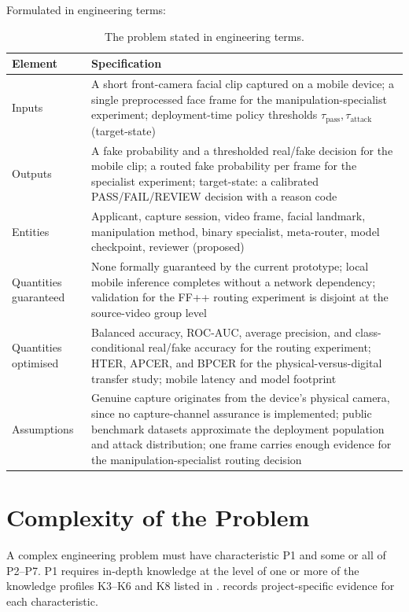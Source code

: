 Formulated in engineering terms:

\begin{table}[H]
\centering
\caption{The problem stated in engineering terms.}
\label{tab:engineering-terms}
\begin{tabularx}{\textwidth}{@{}p{32mm}Y@{}}
\toprule
Element & Specification \\
\midrule
Inputs & A short front-camera facial clip captured on a mobile device; a single
preprocessed face frame for the manipulation-specialist experiment; deployment-time
policy thresholds $\tau_{\mathrm{pass}},\tau_{\mathrm{attack}}$ (target-state) \\
Outputs & A fake probability and a thresholded real/fake decision for the mobile
clip; a routed fake probability per frame for the specialist experiment;
target-state: a calibrated PASS/FAIL/REVIEW decision with a reason code \\
Entities & Applicant, capture session, video frame, facial landmark, manipulation
method, binary specialist, meta-router, model checkpoint, reviewer (proposed) \\
Quantities guaranteed & None formally guaranteed by the current prototype;
local mobile inference completes without a network dependency; validation for
the FF++ routing experiment is disjoint at the source-video group level \\
Quantities optimised & Balanced accuracy, ROC-AUC, average precision, and
class-conditional real/fake accuracy for the routing experiment; HTER, APCER, and
BPCER for the physical-versus-digital transfer study; mobile latency and model
footprint \\
Assumptions & Genuine capture originates from the device's physical camera, since
no capture-channel assurance is implemented; public benchmark datasets
approximate the deployment population and attack distribution; one frame carries
enough evidence for the manipulation-specialist routing decision \\
\bottomrule
\end{tabularx}
\end{table}

\section{Complexity of the Problem}

A complex engineering problem must have characteristic P1 and some or all of
P2--P7. P1 requires in-depth knowledge at the level of one or more
of the knowledge profiles K3--K6 and K8 listed in .
 records project-specific evidence for each characteristic.

